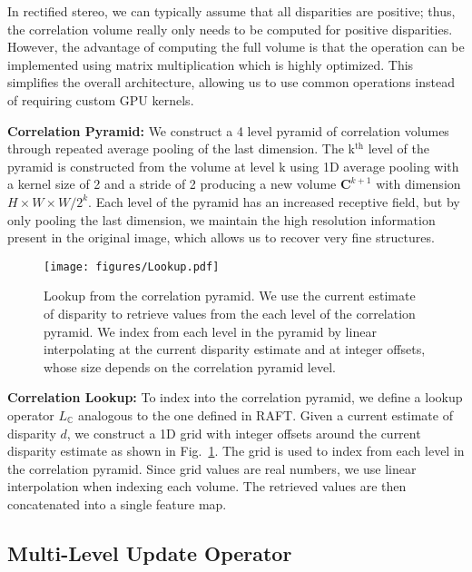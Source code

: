 \documentclass[10pt,twocolumn,letterpaper]{article}
\begin{document}
In rectified stereo, we can typically assume that all disparities are positive; thus, the correlation volume really only needs to be computed for positive disparities. However, the advantage of computing the full volume is that the operation can be implemented using matrix multiplication which is highly optimized. This simplifies the overall architecture, allowing us to use common operations instead of requiring custom GPU kernels. 




\vspace{1mm}
\noindent\textbf{Correlation Pyramid:} We construct a 4 level pyramid of correlation volumes through repeated average pooling of the last dimension. The k$^{\text{th}}$ level of the pyramid is constructed from the volume at level k using 1D average pooling with a kernel size of 2 and a stride of 2 producing a new volume $\mathbf{C}^{k+1}$ with dimension $H \times W \times W/2^k$. Each level of the pyramid has an increased receptive field, but by only pooling the last dimension, we maintain the high resolution information present in the original image, which allows us to recover very fine structures.



\vspace{1mm}


\begin{figure}[t]
    \centering
	\texttt{[image: figures/Lookup.pdf]}
	\caption{Lookup from the correlation pyramid. We use the current estimate of disparity to retrieve values from the each level of the correlation pyramid. We index from each level in the pyramid by linear interpolating at the current disparity estimate and at integer offsets, whose size depends on the correlation pyramid level.}\vspace{-2mm}
	\label{fig:lookup}
\end{figure}


\noindent\textbf{Correlation Lookup:} To index into the correlation pyramid, we define a lookup operator $L_{\mathbb{C}}$ analogous to the one defined in RAFT. Given a current estimate of disparity $d$, we construct a 1D grid with integer offsets around the current disparity estimate as shown in Fig.~\ref{fig:lookup}. The grid is used to index from each level in the correlation pyramid. Since grid values are real numbers, we use linear interpolation when indexing each volume. The retrieved values are then concatenated into a single feature map.

\subsection{Multi-Level Update Operator}
\label{sec:updates}
\end{document}
